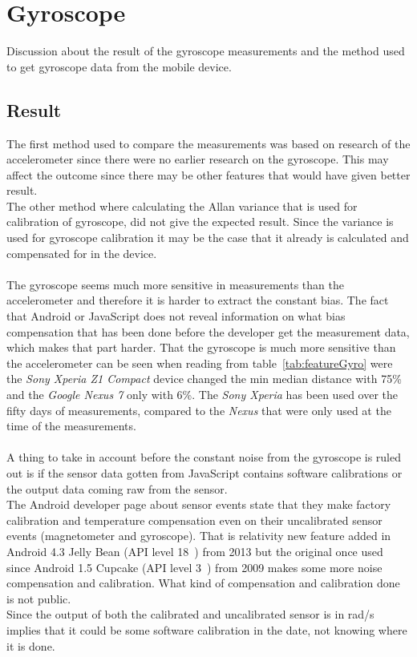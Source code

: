 \section{Gyroscope}
Discussion about the result of the gyroscope measurements and the method used to get gyroscope data from the mobile device.
\subsection{Result}
The first method used to compare the measurements was based on research of the accelerometer since there were no earlier research on the gyroscope. This may affect the outcome since there may be other features that would have given better result. \\
The other method where calculating the Allan variance that is used for calibration of gyroscope, did not give the expected result. Since the variance is used for gyroscope calibration it may be the case that it already is calculated and compensated for in the device.\\
\\
The gyroscope seems much more sensitive in measurements than the accelerometer and therefore it is harder to extract the constant bias. The fact that Android or JavaScript does not reveal information on what bias compensation that has been done before the developer get the measurement data, which makes that part harder. That the gyroscope is much more sensitive than the accelerometer can be seen when reading from table~\ref{tab:featureGyro} were the \textit{Sony Xperia Z1 Compact} device changed the min median distance with 75\% and the \textit{Google Nexus 7} only with 6\%. The \textit{Sony Xperia} has been used over the fifty days of measurements, compared to the \textit{Nexus} that were only used at the time of the measurements. \\
\\
A thing to take in account before the constant noise from the gyroscope is ruled out is if the sensor data gotten from JavaScript contains software calibrations or the output data coming raw from the sensor. \\
The Android developer page about sensor events state that they make factory calibration and temperature compensation even on their uncalibrated sensor events (magnetometer and gyroscope). That is relativity new feature added in Android 4.3 Jelly Bean (API level 18~\cite{android:API18}) from 2013 but the original once used since Android 1.5 Cupcake (API level 3~\cite{android:API3}) from 2009 makes some more noise compensation and calibration. What kind of compensation and calibration done is not public.~\cite[]{android:sensorEvent}\\
Since the output of both the calibrated and uncalibrated sensor is in rad/s implies that it could be some software calibration in the date, not knowing where it is done.

